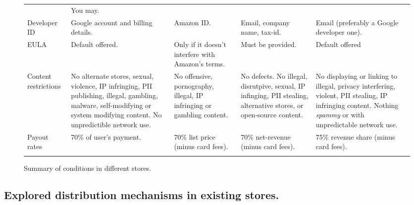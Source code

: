 \documentclass[a4paper]{scrartcl}
\begin{document}
\begin{figure}[!h]
\begin{tabulary}{\linewidth}{lLLLL}
                     & You may.                                                                                                                                                          \\ \addlinespace
Developer ID         & Google account and billing details.
                     & Amazon ID.
                     & Email, company name, tax-id.
                     & Email (preferably a Google developer one).                                                                                                                        \\ \addlinespace
EULA                 & Default offered.
                     & Only if it doesn't interfere with Amazon's terms.
                     & Must be provided.
                     & Default offered                                                                                                                                                   \\ \addlinespace
Content restrictions & No alternate stores, sexual, violence, IP infringing, PII publishing, illegal, gambling, malware, self-modifying or system modifying content.  No unpredictible network use.
                     & No offensive, pornography, illegal, IP infringing or gambling content.
                     & No defects. No illegal, disrutpive, sexual, IP infinging, PII stealing, alternative stores, or open-source content.
                     & No displaying or linking to illegal, privacy interfering, violent, PII stealing, IP infringing content.  Nothing \emph{spammy} or with unpredictable network use. \\ \addlinespace
Payout rates         & 70\% of user's payment.
                     & 70\% list price (minus card fees).
                     & 70\% net-revenue (minus card fees).
                     & 75\% revenue share (minus card fees).                                                                                                                             \\ \addlinespace
\bottomrule
\end{tabulary}
\caption{Summary of conditions in different stores.}
\label{tab:terms}
\end{figure}

\subsection{Explored distribution mechanisms in existing stores.}
\end{document}
